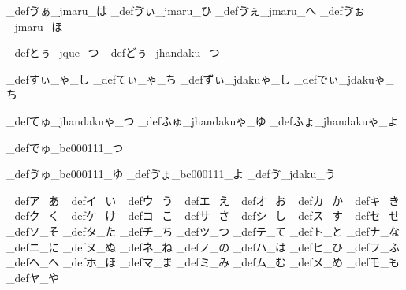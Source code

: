 \brl@char_def{ゔぁ}{\brl@char@alias_jmaru\brl@char@alias_は}
\brl@char_def{ゔぃ}{\brl@char@alias_jmaru\brl@char@alias_ひ}
\brl@char_def{ゔぇ}{\brl@char@alias_jmaru\brl@char@alias_へ}
\brl@char_def{ゔぉ}{\brl@char@alias_jmaru\brl@char@alias_ほ}

\brl@char_def{とぅ}{\brl@char@alias_jque\brl@char@alias_つ}
\brl@char_def{どぅ}{\brl@char@alias_jhandaku\brl@char@alias_つ}

\brl@char_def{すぃ}{\brl@char@alias_ゃ\brl@char@alias_し}
\brl@char_def{てぃ}{\brl@char@alias_ゃ\brl@char@alias_ち}
\brl@char_def{ずぃ}{\brl@char@alias_jdakuゃ\brl@char@alias_し}
\brl@char_def{でぃ}{\brl@char@alias_jdakuゃ\brl@char@alias_ち}

\brl@char_def{てゅ}{\brl@char@alias_jhandakuゃ\brl@char@alias_つ}
\brl@char_def{ふゅ}{\brl@char@alias_jhandakuゃ\brl@char@alias_ゆ}
\brl@char_def{ふょ}{\brl@char@alias_jhandakuゃ\brl@char@alias_よ}

\brl@char_def{でゅ}{\brl@char_bc000111\brl@char@alias_つ}

\brl@char_def{ゔゅ}{\brl@char_bc000111\brl@char@alias_ゆ}
\brl@char_def{ゔょ}{\brl@char_bc000111\brl@char@alias_よ}
\brl@char_def{ゔ}{\brl@char@alias_jdaku\brl@char@alias_う}



\brl@char_def{ア}{\brl@char@alias_あ}
\brl@char_def{イ}{\brl@char@alias_い}
\brl@char_def{ウ}{\brl@char@alias_う}
\brl@char_def{エ}{\brl@char@alias_え}
\brl@char_def{オ}{\brl@char@alias_お}
\brl@char_def{カ}{\brl@char@alias_か}
\brl@char_def{キ}{\brl@char@alias_き}
\brl@char_def{ク}{\brl@char@alias_く}
\brl@char_def{ケ}{\brl@char@alias_け}
\brl@char_def{コ}{\brl@char@alias_こ}
\brl@char_def{サ}{\brl@char@alias_さ}
\brl@char_def{シ}{\brl@char@alias_し}
\brl@char_def{ス}{\brl@char@alias_す}
\brl@char_def{セ}{\brl@char@alias_せ}
\brl@char_def{ソ}{\brl@char@alias_そ}
\brl@char_def{タ}{\brl@char@alias_た}
\brl@char_def{チ}{\brl@char@alias_ち}
\brl@char_def{ツ}{\brl@char@alias_つ}
\brl@char_def{テ}{\brl@char@alias_て}
\brl@char_def{ト}{\brl@char@alias_と}
\brl@char_def{ナ}{\brl@char@alias_な}
\brl@char_def{ニ}{\brl@char@alias_に}
\brl@char_def{ヌ}{\brl@char@alias_ぬ}
\brl@char_def{ネ}{\brl@char@alias_ね}
\brl@char_def{ノ}{\brl@char@alias_の}
\brl@char_def{ハ}{\brl@char@alias_は}
\brl@char_def{ヒ}{\brl@char@alias_ひ}
\brl@char_def{フ}{\brl@char@alias_ふ}
\brl@char_def{ヘ}{\brl@char@alias_へ}
\brl@char_def{ホ}{\brl@char@alias_ほ}
\brl@char_def{マ}{\brl@char@alias_ま}
\brl@char_def{ミ}{\brl@char@alias_み}
\brl@char_def{ム}{\brl@char@alias_む}
\brl@char_def{メ}{\brl@char@alias_め}
\brl@char_def{モ}{\brl@char@alias_も}
\brl@char_def{ヤ}{\brl@char@alias_や}

